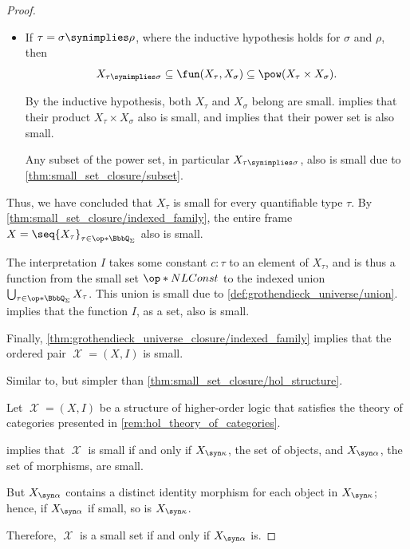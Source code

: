 \begin{proof}
\begin{itemize}
    \item If \( \tau = \sigma \synimplies \rho \), where the inductive hypothesis holds for \( \sigma \) and \( \rho \), then
    \begin{equation*}
      X_{\tau \synimplies \sigma} \subseteq \fun(X_\tau, X_\sigma) \subseteq \pow(X_\tau \times X_\sigma).
    \end{equation*}

    By the inductive hypothesis, both \( X_\tau \) and \( X_\sigma \) belong are small.  implies that their product \( X_\tau \times X_\sigma \) also is small, and  implies that their power set is also small.

    Any subset of the power set, in particular \( X_{\tau \synimplies \sigma} \), also is small due to \cref{thm:small_set_closure/subset}.
  \end{itemize}

  Thus, we have concluded that \( X_\tau \) is small for every quantifiable type \( \tau \). By \cref{thm:small_set_closure/indexed_family}, the entire frame \( X = \seq{ X_\tau }_{\tau \in \op*{\BbbQ_\Sigma}} \) also is small.

  The interpretation \( I \) takes some constant \( c: \tau \) to an element of \( X_\tau \), and is thus a function from the small set \( \op*{NLConst} \) to the indexed union \( \bigcup_{\tau \in \op*{\BbbQ_\Sigma}} X_\tau \). This union is small due to \ref{def:grothendieck_universe/union}.  implies that the function \( I \), as a set, also is small.

  Finally, \cref{thm:grothendieck_universe_closure/indexed_family} implies that the ordered pair \( \mscrX = (X, I) \) is small.

   Similar to, but simpler than \cref{thm:small_set_closure/hol_structure}.

   Let \( \mscrX = (X, I) \) be a structure of higher-order logic that satisfies the theory of categories presented in \cref{rem:hol_theory_of_categories}.

   implies that \( \mscrX \) is small if and only if \( X_{\syn\kappa} \), the set of objects, and \( X_{\syn\alpha} \), the set of morphisms, are small.

  But \( X_{\syn\alpha} \) contains a distinct identity morphism for each object in \( X_{\syn\kappa} \); hence, if \( X_{\syn\alpha} \) if small, so is \( X_{\syn\kappa} \).

  Therefore, \( \mscrX \) is a small set if and only if \( X_{\syn\alpha} \) is.
\end{proof}

